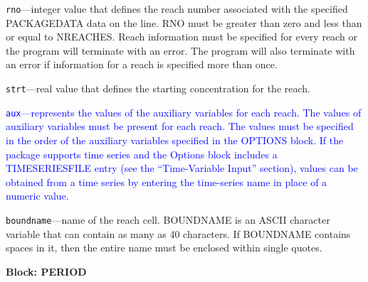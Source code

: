 \begin{description}
\item \texttt{rno}---integer value that defines the reach number associated with the specified PACKAGEDATA data on the line. RNO must be greater than zero and less than or equal to NREACHES. Reach information must be specified for every reach or the program will terminate with an error.  The program will also terminate with an error if information for a reach is specified more than once.

\item \texttt{strt}---real value that defines the starting concentration for the reach.

\item \textcolor{blue}{\texttt{aux}---represents the values of the auxiliary variables for each reach. The values of auxiliary variables must be present for each reach. The values must be specified in the order of the auxiliary variables specified in the OPTIONS block.  If the package supports time series and the Options block includes a TIMESERIESFILE entry (see the ``Time-Variable Input'' section), values can be obtained from a time series by entering the time-series name in place of a numeric value.}

\item \texttt{boundname}---name of the reach cell.  BOUNDNAME is an ASCII character variable that can contain as many as 40 characters.  If BOUNDNAME contains spaces in it, then the entire name must be enclosed within single quotes.

\end{description}
\item \textbf{Block: PERIOD}

